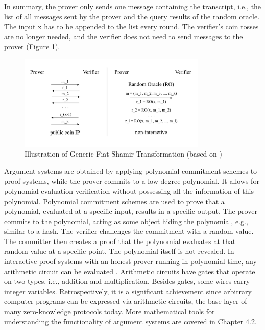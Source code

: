 In summary, the prover only sends one message containing the transcript, i.e., the list of all messages sent by the prover and the query results of the random oracle. The input x has to be appended to the list every round. The verifier's coin tosses are no longer needed, and the verifier does not need to send messages to the prover (Figure \ref{fig:FST}).
\begin{figure}[hbt]
	\centering
		\includegraphics[width=0.8\textwidth]{Pictures/FST.png}
	\caption{Illustration of Generic Fiat Shamir Transformation (based on \citet{Thaler})}
	\label{fig:FST}
\end{figure}
Argument systems are obtained by applying polynomial commitment schemes to proof systems, while the prover commits to a low-degree polynomial. It allows for polynomial evaluation verification without possessing all the information of this polynomial. Polynomial commitment schemes are used to prove that a polynomial, evaluated at a specific input, results in a specific output. The prover commits to the polynomial, acting as some object hiding the polynomial, e.g., similar to a hash. The verifier challenges the commitment with a random value. The committer then creates a proof that the polynomial evaluates at that random value at a specific point. The polynomial itself is not revealed. In interactive proof systems with an honest prover running in polynomial time, any arithmetic circuit can be evaluated \citep{GKR10.1145/1374376.1374396}. Arithmetic circuits have gates that operate on two types, i.e., addition and multiplication. Besides gates, some wires carry integer variables. Retrospectively, it is a significant achievement since arbitrary computer programs can be expressed via arithmetic circuits, the base layer of many zero-knowledge protocols today. More mathematical tools for understanding the functionality of argument systems are covered in Chapter 4.2.
